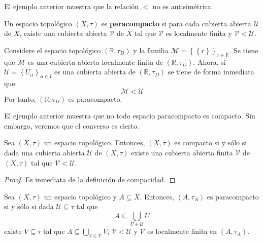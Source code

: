 \documentclass[12pt]{report}
\theoremstyle{largebreak}
\begin{document}
    El ejemplo anterior muestra que la relación $<$ no es antisimétrica.

    \begin{mydef}
        Un espacio topológico $(X,\tau)$ es \textbf{paracompacto} si para cada cubierta abierta $\mathcal{U}$ de $X$, existe una cubierta abierta $\mathcal{V}$ de $X$ tal que $\mathcal{V}$ es localmente finita y $\mathcal{V}<\mathcal{U}$. 
    \end{mydef}

    \begin{exa}
        Considere el espacio topológico $(\mathbb{R},\tau_D)$ y la familia $\mathcal{M}=\left\{\left\{r\right\} \right\}_{ r\in \mathbb{R}}$. Se tiene que $\mathcal{M}$ es una cubierta abierta localmente finita de $(\mathbb{R},\tau_D)$. Ahora, si $\mathcal{U}=\left\{U_\alpha \right\}_{\alpha\in I}$ es una cubierta abierta de $(\mathbb{R},\tau_D)$ se tiene de forma inmediata que:
        \begin{equation*}
            \mathcal{M}<\mathcal{U}
        \end{equation*}
        Por tanto, $(\mathbb{R},\tau_D)$ es paracompacto.
    \end{exa}

    El ejemplo anterior muestra que no todo espacio paracompacto es compacto. Sin embargo, veremos que el converso es cierto.

    \begin{excer}
        Sea $(X,\tau)$ un espacio topológico. Entonces, $(X,\tau)$ es compacto si y sólo si dada una cubierta abierta $\mathcal{U}$ de $(X,\tau)$ existe una cubierta abierta finita $\mathcal{V}$ de $(X,\tau)$ tal que $\mathcal{V}<\mathcal{U}$.
    \end{excer}

    \begin{proof}
        Es inmediata de la definición de compacidad.
    \end{proof}

    \begin{propo}
        Sea $(X,\tau)$ un espacio topológico y $A\subseteq X$. Entonces, $(A,\tau_A)$ es paracompacto si y sólo si dada $\mathcal{U}\subseteq\tau$ tal que
        \begin{equation*}
            A\subseteq\bigcup_{ U\in\mathcal{U}}U
        \end{equation*}
        existe $V\subseteq\tau$ tal que $A\subseteq\bigcup_{ V\in\mathcal{V}}V$, $\mathcal{V}<\mathcal{U}$ y $\mathcal{V}$ es localmente finita en $(A,\tau_A)$.
    \end{propo}
\end{document}
